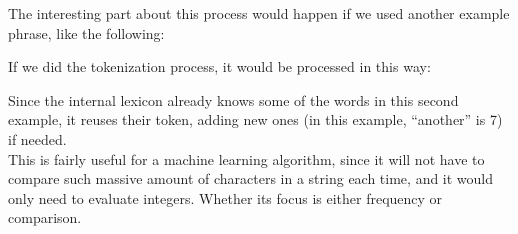 The interesting part about this process would happen if we used another example phrase, like the following:
\begin{center}
\end{center}

If we did the tokenization process, it would be processed in this way:
\begin{center}
\end{center}

Since the internal lexicon already knows some of the words in this second example, it reuses their token, adding new ones (in this example, ``another'' is 7) if needed.\\

This is fairly useful for a machine learning algorithm, since it will not have to compare such massive amount of characters in a string each time, and it would only need to evaluate integers. Whether its focus is either frequency or comparison.

\clearpage